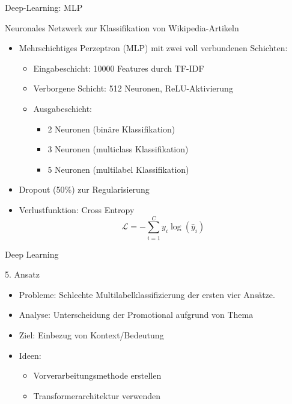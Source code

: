 \documentclass[aspectratio=169]{beamer} %
\begin{document}
\begin{frame}{Deep-Learning: MLP}
    \begin{block}{Neuronales Netzwerk zur Klassifikation von Wikipedia-Artikeln}
        \begin{itemize}
            \item Mehrschichtiges Perzeptron (MLP) mit zwei voll verbundenen Schichten:
                  \begin{itemize}
                      \item Eingabeschicht: 10000 Features durch TF-IDF
                      \item Verborgene Schicht: 512 Neuronen, ReLU-Aktivierung
                      \item Ausgabeschicht:
                            \begin{itemize}
                                \item 2 Neuronen (binäre Klassifikation)
                                \item 3 Neuronen (multiclass Klassifikation)
                                \item 5 Neuronen (multilabel Klassifikation)
                            \end{itemize}
                  \end{itemize}
            \item Dropout (50\%) zur Regularisierung
            \item Verlustfunktion: Cross Entropy
                  \begin{equation*}
                      \mathcal{L} = - \sum_{i=1}^{C} y_i \log(\hat{y}_i)
                  \end{equation*}
        \end{itemize}
    \end{block}
\end{frame}

\begin{frame}{Deep Learning}
    \begin{block}{5. Ansatz}
       \begin{itemize}
       
    \item Probleme: Schlechte Multilabelklassifizierung der ersten vier Ansätze.
    \item    Analyse: Unterscheidung der Promotional aufgrund von Thema
     \item        Ziel:
        Einbezug von Kontext/Bedeutung \\
        \item Ideen:
        \begin{itemize}
            \item Vorverarbeitungsmethode erstellen
            \item Transformerarchitektur verwenden
        \end{itemize}
        \end{itemize}   
    \end{block}
\end{frame}
\end{document}
